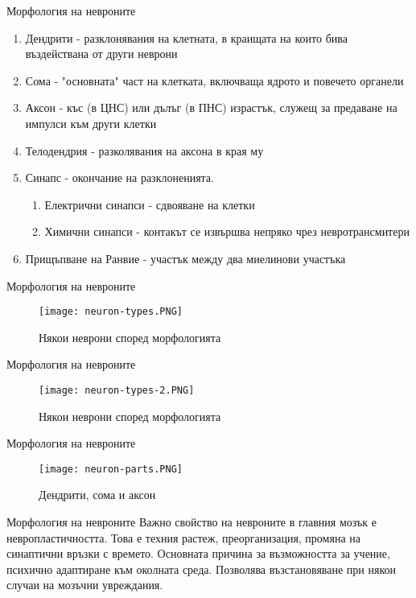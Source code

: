 \begin{frame}[t]{Морфология на невроните}
  \begin{enumerate}
    \item   Дендрити - разклонявания на клетната, в краищата на които бива въздействана от други неврони
    \item   Сома - "основната" част на клетката, включваща ядрото и повечето органели
    \item   Аксон - къс (в ЦНС) или дълъг (в ПНС) израстък, служещ за предаване на импулси към други клетки
    \item   Телодендрия - разколявания на аксона в края му
    \item   Синапс - окончание на разклоненията. 
    \begin{enumerate}
      \item   Електрични синапси - сдвояване на клетки
      \item   Химични синапси - контакът се извършва непряко чрез невротрансмитери
    \end{enumerate}
    \item   Прищъпване на Ранвие - участък между два миелинови участъка
  \end{enumerate}
\end{frame}

\begin{frame}[t]{Морфология на невроните}
  \begin{figure}[htbp!]
    \centering
    \texttt{[image: neuron-types.PNG]}
    \caption{Някои неврони според морфологията \cite[Фиг 1.2]{Neuroscience}}
  \end{figure}
\end{frame}

\begin{frame}[t]{Морфология на невроните}
  \begin{figure}[htbp!]
    \centering
    \texttt{[image: neuron-types-2.PNG]}
    \caption{Някои неврони според морфологията \cite[Фиг 1.4]{Neuron}}
  \end{figure}
\end{frame}

\begin{frame}[t]{Морфология на невроните}
  \begin{figure}[htbp!]
    \centering
    \texttt{[image: neuron-parts.PNG]}
    \caption{Дендрити, сома и аксон \cite[Фиг 1.3]{Neuroscience}}
    \label{figure:usf}
  \end{figure}
\end{frame}

\begin{frame}[t]{Морфология на невроните}
  Важно свойство на невроните в главния мозък е невропластичността.
  Това е техния растеж, преорганизация, промяна на синаптични връзки с времето.
  Основната причина за възможността за учение, психично адаптиране към околната среда.
  Позволява възстановяване при някои случаи на мозъчни увреждания. 
\end{frame}


